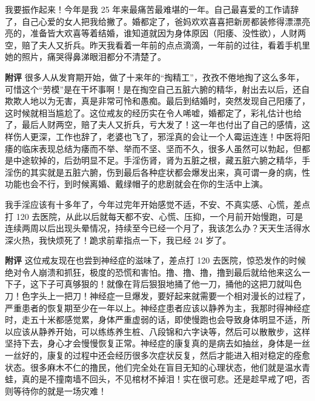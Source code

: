 \begin{case}
    我要振作起来！今年是我 25 年来最痛苦最难堪的一年。自己最喜爱的工作请辞了，自己心爱的女人把我给撇了。婚都定了，爸妈欢欢喜喜把新房都装修得漂漂亮亮的，准备皆大欢喜等着结婚，谁知道就因为身体原因（阳痿、没性欲），人财两空，赔了夫人又折兵。昨天我看着一年前的点点滴滴，一年前的过往，看着手机里她的照片，痛哭得鼻涕眼泪都分不清楚了。

    \textbf{附评} 很多人从发育期开始，做了十来年的“掏精工”，孜孜不倦地掏了这么多年，可惜这个“劳模”是在干坏事啊！是在掏空自己五脏六腑的精华，射出去以后，还自欺欺人地以为无害，真是非常可怜和愚痴。最后到结婚时，突然发现自己阳痿了，这时候就相当尴尬了。这位戒友的经历实在令人唏嘘，婚都定了，彩礼估计也给了，最后人财两空，赔了夫人又折兵，亏大发了！这一年也付出了自己的感情，这样伤人更深，工作也辞了，老婆也飞了，邪淫真的会让一个人霉运连连！中医将阳痿的临床表现总结为痿而不举、举而不坚、坚而不久，很多人虽然可以勃起，但都是中途软掉的，后劲明显不足。手淫伤肾，肾为五脏之根，藏五脏六腑之精华，手淫伤的其实就是五脏六腑，伤到最后各种症状都会爆发出来，真可谓一身的病，性功能也会不行，到时候离婚、戴绿帽子的悲剧就会在你的生活中上演。
\end{case}

\begin{case}
    我手淫应该有十多年了，今年过完年开始感觉不适，不安、不真实感、心慌，差点打 120 去医院，从此以后就每天都不安、心慌、压抑，一个月前开始慢跑，可是连续两周以后出现头晕情况，持续至今已经一个月了，我该怎么办？天天生活得水深火热，我快烦死了！跪求前辈指点一下，我已经 24 岁了。

    \textbf{附评} 这位戒友现在也尝到神经症的滋味了，差点打 120 去医院，惊恐发作的时候绝对令人崩溃和抓狂，极度的恐慌和害怕。撸、撸、撸，撸到最后就给他来这么一下子，这下子可真够狠的！就像在背后狠狠地捅了他一刀，捅他的这把刀就叫色刀！色字头上一把刀！神经症一旦爆发，要好起来就需要一个相对漫长的过程了，严重患者的恢复期至少在一年以上。神经症患者应该以静养为主，我那时得神经症时，走五十米都感觉累，身体严重虚弱的话，即使慢跑也会导致身体明显不适，所以应该从静养开始，可以练练养生桩、八段锦和六字诀等，然后可以散散步，这样坚持下去，身心才会慢慢恢复正常。神经症的康复真的是病去如抽丝，身体是一丝一丝好的，康复的过程中还会经历很多次症状反复，然后才能进入相对稳定的痊愈状态。很多麻木不仁的撸民，他们完全处在盲目无知的心理状态，他们就是温水青蛙，真的是不撞南墙不回头，不见棺材不掉泪！实在很可悲。还是趁早戒了吧，否则等待你的就是一场灾难！
\end{case}

